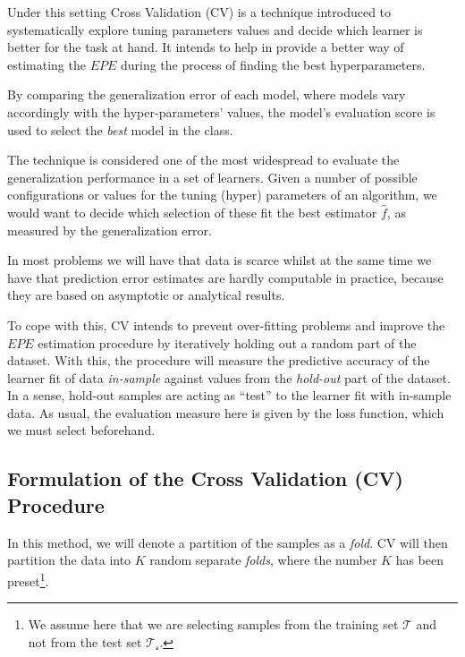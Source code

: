 Under this setting Cross Validation (CV) is a technique introduced to systematically explore tuning parameters values and decide which learner is better for the task at hand.
It intends to help in provide a better way of estimating the $EPE$ during the process of finding the best hyperparameters.

By comparing the generalization error of each model, where models vary accordingly with the hyper-parameters' values, the model's evaluation score is used to select the \textit{best} model in the class.

The technique is considered one of the most widespread to evaluate the generalization performance in a set of learners.
Given a number of possible configurations or values for the tuning (hyper) parameters of an algorithm, we would want to decide which selection of these fit the best estimator $\hat{f}$, as measured by the generalization error.

%

In most problems we will have that data is scarce whilst at the same time we have that prediction error estimates are hardly computable in practice, because they are based on asymptotic or analytical results.

To cope with this, CV intends to prevent over-fitting problems and improve the $EPE$ estimation procedure by iteratively holding out a random part of the dataset.
With this, the procedure will measure the predictive accuracy of the learner fit of data \textit{in-sample} against values from the \textit{hold-out} part of the dataset.
In a sense, hold-out samples are acting as ``test''  to the learner fit with in-sample data.
As usual, the evaluation measure here is given by the loss function, which we must select beforehand.

\subsection{Formulation of the Cross Validation (CV) Procedure}\label{subsection:crossValidationProcedure}

In this method, we will denote a partition of the samples as a \textit{fold}.
CV will then partition the data into $K$ random separate \textit{folds}, where the number $K$ has been preset\footnote{ We assume here that we are selecting samples from the training set $\mathcal{T}$ and not from the test set $\mathcal{T_s}$.}.

